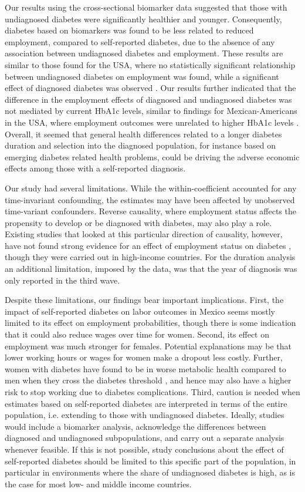 \documentclass[12pt,english]{article}
\begin{document}
Our results using the cross-sectional biomarker data suggested that  those with undiagnosed diabetes were significantly healthier and younger. Consequently, diabetes based on biomarkers was found to be less related to reduced employment, compared to self-reported diabetes, due to the absence of any association between undiagnosed diabetes and employment. These results are similar to those found for the USA, where no statistically significant relationship between undiagnosed diabetes on employment was found, while a significant effect of diagnosed diabetes was observed \parencite{Minor2015}. Our results further indicated that the  difference in the employment effects of diagnosed and undiagnosed diabetes was not mediated by current \ac{HbA1c} levels, similar to findings for Mexican-Americans in the USA, where employment outcomes were unrelated to higher \ac{HbA1c} levels \parencite{BrownIII2011}. Overall, it seemed that general health differences related to a longer diabetes duration and selection into the diagnosed population, for instance based on emerging diabetes related health problems, could be driving the adverse economic effects among those with a self-reported diagnosis.

Our study had several limitations. While the within-coefficient accounted for any time-invariant confounding, the estimates may have been affected by unobserved time-variant confounders. Reverse causality, where employment status affects the propensity to develop or be diagnosed with diabetes, may also play a role. Existing studies that looked at this particular direction of causality, however, have not found strong evidence for an effect of employment status on diabetes \parencite{Bergemann2011,Schaller2015}, though they were carried out in high-income countries. For the duration analysis an additional limitation, imposed by the data, was that the year of diagnosis was only reported in the third wave.

Despite these limitations, our findings bear important implications. First, the impact of self-reported diabetes on labor outcomes in Mexico seems mostly limited to its effect on employment probabilities, though there is some indication that it could also reduce wages over time for women.  Second, its effect on employment was much stronger for females. Potential explanations may be that lower working hours or wages for women make a dropout less costly. Further, women with diabetes have found to be in worse metabolic health compared to men when they cross the diabetes threshold \parencite{Peters2015}, and hence may also have a higher risk to stop working due to diabetes complications. Third, caution is needed when estimates based on self-reported diabetes are interpreted in terms of the entire population, i.e. extending to those with undiagnosed diabetes. Ideally, studies would  include a biomarker analysis, acknowledge the differences between diagnosed and undiagnosed subpopulations, and carry out a separate analysis whenever feasible. If this is not possible, study conclusions about the effect of self-reported diabetes should be limited to this specific part of the population, in particular in environments where the share of undiagnosed diabetes is high, as is the case for most low- and middle income countries.
\end{document}
